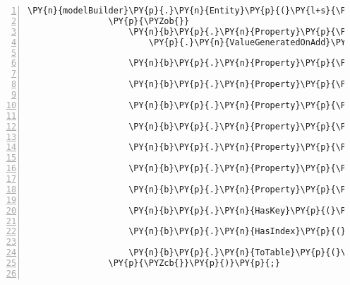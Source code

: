 \begin{Verbatim}[commandchars=\\\{\},numbers=left,firstnumber=1,stepnumber=1,numberblanklines=0]
            \PY{n}{modelBuilder}\PY{p}{.}\PY{n}{Entity}\PY{p}{(}\PY{l+s}{\PYZdq{}CryptoStats.Models.Stat\PYZdq{}}\PY{p}{,} \PY{n}{b} \PY{p}{=}\PY{p}{\PYZgt{}}
                \PY{p}{\PYZob{}}
                    \PY{n}{b}\PY{p}{.}\PY{n}{Property}\PY{p}{\PYZlt{}}\PY{k+kt}{int}\PY{p}{\PYZgt{}}\PY{p}{(}\PY{l+s}{\PYZdq{}StatId\PYZdq{}}\PY{p}{)}
                        \PY{p}{.}\PY{n}{ValueGeneratedOnAdd}\PY{p}{(}\PY{p}{)}\PY{p}{;}

                    \PY{n}{b}\PY{p}{.}\PY{n}{Property}\PY{p}{\PYZlt{}}\PY{k+kt}{int}\PY{p}{\PYZgt{}}\PY{p}{(}\PY{l+s}{\PYZdq{}ExchangeId\PYZdq{}}\PY{p}{)}\PY{p}{;}

                    \PY{n}{b}\PY{p}{.}\PY{n}{Property}\PY{p}{\PYZlt{}}\PY{k+kt}{decimal}\PY{p}{\PYZgt{}}\PY{p}{(}\PY{l+s}{\PYZdq{}HighestLatestDiff\PYZdq{}}\PY{p}{)}\PY{p}{;}

                    \PY{n}{b}\PY{p}{.}\PY{n}{Property}\PY{p}{\PYZlt{}}\PY{n}{TimeSpan}\PY{p}{\PYZgt{}}\PY{p}{(}\PY{l+s}{\PYZdq{}avgDeclineTime\PYZdq{}}\PY{p}{)}\PY{p}{;}

                    \PY{n}{b}\PY{p}{.}\PY{n}{Property}\PY{p}{\PYZlt{}}\PY{k+kt}{decimal}\PY{p}{\PYZgt{}}\PY{p}{(}\PY{l+s}{\PYZdq{}avgDiff\PYZdq{}}\PY{p}{)}\PY{p}{;}

                    \PY{n}{b}\PY{p}{.}\PY{n}{Property}\PY{p}{\PYZlt{}}\PY{n}{TimeSpan}\PY{p}{\PYZgt{}}\PY{p}{(}\PY{l+s}{\PYZdq{}avgGrowthTime\PYZdq{}}\PY{p}{)}\PY{p}{;}

                    \PY{n}{b}\PY{p}{.}\PY{n}{Property}\PY{p}{\PYZlt{}}\PY{n}{DateTime}\PY{p}{\PYZgt{}}\PY{p}{(}\PY{l+s}{\PYZdq{}endDate\PYZdq{}}\PY{p}{)}\PY{p}{;}

                    \PY{n}{b}\PY{p}{.}\PY{n}{Property}\PY{p}{\PYZlt{}}\PY{n}{DateTime}\PY{p}{\PYZgt{}}\PY{p}{(}\PY{l+s}{\PYZdq{}startDate\PYZdq{}}\PY{p}{)}\PY{p}{;}

                    \PY{n}{b}\PY{p}{.}\PY{n}{HasKey}\PY{p}{(}\PY{l+s}{\PYZdq{}StatId\PYZdq{}}\PY{p}{)}\PY{p}{;}

                    \PY{n}{b}\PY{p}{.}\PY{n}{HasIndex}\PY{p}{(}\PY{l+s}{\PYZdq{}ExchangeId\PYZdq{}}\PY{p}{)}\PY{p}{;}

                    \PY{n}{b}\PY{p}{.}\PY{n}{ToTable}\PY{p}{(}\PY{l+s}{\PYZdq{}Stats\PYZdq{}}\PY{p}{)}\PY{p}{;}
                \PY{p}{\PYZcb{}}\PY{p}{)}\PY{p}{;}


\end{Verbatim}
